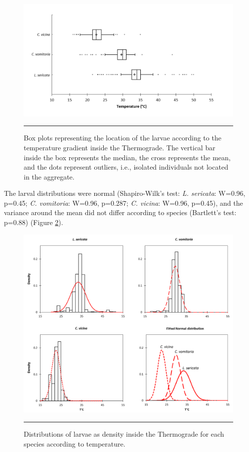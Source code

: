 \begin{figure}[ht]
\centering
		\includegraphics[width=1 \textwidth]{Figures/boxplotcindy.png}
		\rule{35em}{0.5pt}
		\caption[BoxplotCindy]{Box plots representing the location of the larvae according to the temperature gradient inside the Thermograde. The vertical bar inside the box represents the median, the cross represents the mean, and the dots represent outliers, i.e., isolated individuals not located in the aggregate.}
	\label{fig:boxplotcindy}
\end{figure}   

The larval distributions were normal (Shapiro-Wilk’s test: \textit{L. sericata}: W=0.96, p=0.45; \textit{C. vomitoria}: W=0.96, p=0.287; \textit{C. vicina}: W=0.96, p=0.45), and the variance around the mean did not differ according to species (Bartlett’s test: p=0.88) (Figure \ref{fig:districindy}).


\begin{figure}[ht]
\centering
		\includegraphics[width=1 \textwidth]{Figures/districindy.png}
		\rule{35em}{0.5pt}
		\caption[DistriCindy]{Distributions of larvae as density inside the Thermograde for each species according to temperature.}
	\label{fig:districindy}
\end{figure}  



